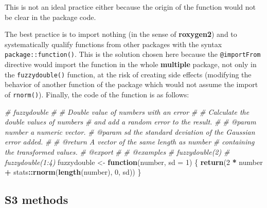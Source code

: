 \documentclass[
  12pt,
  american,
  a4paper,
  extrafontsizes,onecolumn,openright
  ]{memoir}
\newenvironment{Shaded}{\begin{snugshade}}{\end{snugshade}}
\newcommand{\AttributeTok}[1]{\textcolor[rgb]{0.13,0.29,0.53}{#1}}
\newcommand{\CommentTok}[1]{\textcolor[rgb]{0.56,0.35,0.01}{\textit{#1}}}
\newcommand{\ControlFlowTok}[1]{\textcolor[rgb]{0.13,0.29,0.53}{\textbf{#1}}}
\newcommand{\DecValTok}[1]{\textcolor[rgb]{0.00,0.00,0.81}{#1}}
\newcommand{\FunctionTok}[1]{\textcolor[rgb]{0.13,0.29,0.53}{\textbf{#1}}}
\newcommand{\NormalTok}[1]{#1}
\newcommand{\OtherTok}[1]{\textcolor[rgb]{0.56,0.35,0.01}{#1}}
\newcommand{\SpecialCharTok}[1]{\textcolor[rgb]{0.81,0.36,0.00}{\textbf{#1}}}
\begin{document}
\normalsize

This is not an ideal practice either because the origin of the function would not be clear in the package code.

The best practice is to import nothing (in the sense of \textbf{roxygen2}) and to systematically qualify functions from other packages with the syntax \texttt{package::function()}.
This is the solution chosen here because the \texttt{@importFrom} directive would import the function in the whole \textbf{multiple} package, not only in the \texttt{fuzzydouble()} function, at the risk of creating side effects (modifying the behavior of another function of the package which would not assume the import of \texttt{rnorm()}).
Finally, the code of the function is as follows:

\scriptsize

\begin{Shaded}
\begin{Highlighting}[]
\CommentTok{\#\textquotesingle{} fuzzydouble}
\CommentTok{\#\textquotesingle{} }
\CommentTok{\#\textquotesingle{} Double value of numbers with an error}
\CommentTok{\#\textquotesingle{} }
\CommentTok{\#\textquotesingle{} Calculate the double values of numbers }
\CommentTok{\#\textquotesingle{} and add a random error to the result.}
\CommentTok{\#\textquotesingle{}}
\CommentTok{\#\textquotesingle{} @param number a numeric vector.}
\CommentTok{\#\textquotesingle{} @param sd the standard deviation of the Gaussian error added.}
\CommentTok{\#\textquotesingle{}}
\CommentTok{\#\textquotesingle{} @return A vector of the same length as \textasciigrave{}number\textasciigrave{}}
\CommentTok{\#\textquotesingle{}  containing the transformed values.}
\CommentTok{\#\textquotesingle{} @export}
\CommentTok{\#\textquotesingle{}}
\CommentTok{\#\textquotesingle{} @examples}
\CommentTok{\#\textquotesingle{} fuzzydouble(2)}
\CommentTok{\#\textquotesingle{} fuzzydouble(1:4)}
\NormalTok{fuzzydouble }\OtherTok{\textless{}{-}} \ControlFlowTok{function}\NormalTok{(number, }\AttributeTok{sd =} \DecValTok{1}\NormalTok{) \{}
    \FunctionTok{return}\NormalTok{(}\DecValTok{2} \SpecialCharTok{*}\NormalTok{ number }\SpecialCharTok{+}\NormalTok{ stats}\SpecialCharTok{::}\FunctionTok{rnorm}\NormalTok{(}\FunctionTok{length}\NormalTok{(number), }\DecValTok{0}\NormalTok{, sd))}
\NormalTok{\}}
\end{Highlighting}
\end{Shaded}

\normalsize

\subsection{S3 methods}\label{s3-methods}
\end{document}
